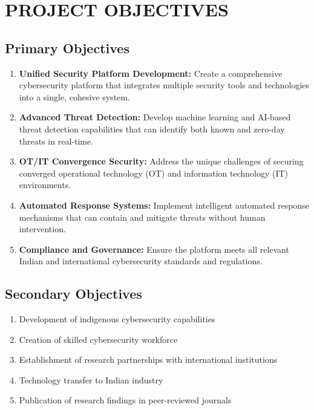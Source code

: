 \documentclass[12pt,a4paper]{article}
\begin{document}
\section{PROJECT OBJECTIVES}

\subsection{Primary Objectives}
\begin{enumerate}[leftmargin=*]
\item \textbf{Unified Security Platform Development:} Create a comprehensive cybersecurity platform that integrates multiple security tools and technologies into a single, cohesive system.

\item \textbf{Advanced Threat Detection:} Develop machine learning and AI-based threat detection capabilities that can identify both known and zero-day threats in real-time.

\item \textbf{OT/IT Convergence Security:} Address the unique challenges of securing converged operational technology (OT) and information technology (IT) environments.

\item \textbf{Automated Response Systems:} Implement intelligent automated response mechanisms that can contain and mitigate threats without human intervention.

\item \textbf{Compliance and Governance:} Ensure the platform meets all relevant Indian and international cybersecurity standards and regulations.
\end{enumerate}

\subsection{Secondary Objectives}
\begin{enumerate}[leftmargin=*]
\item Development of indigenous cybersecurity capabilities
\item Creation of skilled cybersecurity workforce
\item Establishment of research partnerships with international institutions
\item Technology transfer to Indian industry
\item Publication of research findings in peer-reviewed journals
\end{enumerate}
\end{document}
